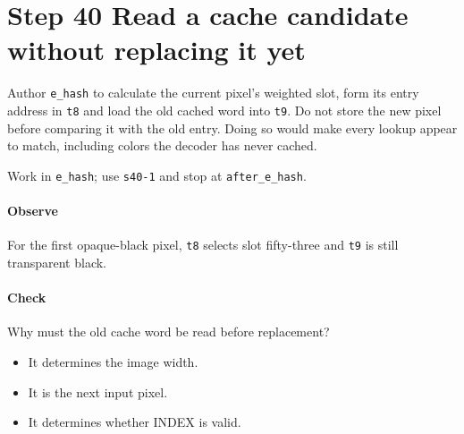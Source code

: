 \section{Step 40 Read a cache candidate without replacing it yet}\label{qoi-s40}
Author \texttt{e\_hash} to calculate the current pixel’s weighted slot, form its entry address in \texttt{t8} and load the old cached word into \texttt{t9}. Do not store the new pixel before comparing it with the old entry. Doing so would make every lookup appear to match, including colors the decoder has never cached.

Work in \texttt{e\_hash}; use \texttt{s40-1} and stop at \texttt{after\_e\_hash}.

\paragraph{Observe} For the first opaque-black pixel, \texttt{t8} selects slot fifty-three and \texttt{t9} is still transparent black.

\paragraph{Check} Why must the old cache word be read before replacement?
\begin{itemize}
  \item[A.] It determines the image width.
  \item[B.] It is the next input pixel.
  \item[C.] It determines whether INDEX is valid.
\end{itemize}
